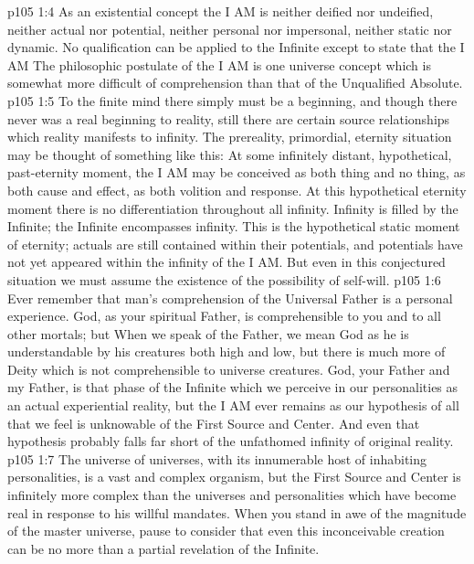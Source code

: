 \vs p105 1:4 As an existential concept the I AM is neither deified nor undeified, neither actual nor potential, neither personal nor impersonal, neither static nor dynamic. No qualification can be applied to the Infinite except to state that the I AM  The philosophic postulate of the I AM is one universe concept which is somewhat more difficult of comprehension than that of the Unqualified Absolute.
\vs p105 1:5 To the finite mind there simply must be a beginning, and though there never was a real beginning to reality, still there are certain source relationships which reality manifests to infinity. The prereality, primordial, eternity situation may be thought of something like this: At some infinitely distant, hypothetical, past\hyp{}eternity moment, the I AM may be conceived as both thing and no thing, as both cause and effect, as both volition and response. At this hypothetical eternity moment there is no differentiation throughout all infinity. Infinity is filled by the Infinite; the Infinite encompasses infinity. This is the hypothetical static moment of eternity; actuals are still contained within their potentials, and potentials have not yet appeared within the infinity of the I AM. But even in this conjectured situation we must assume the existence of the possibility of self\hyp{}will.
\pc \vs p105 1:6 Ever remember that man’s comprehension of the Universal Father is a personal experience. God, as your spiritual Father, is comprehensible to you and to all other mortals; but  When we speak of the Father, we mean God as he is understandable by his creatures both high and low, but there is much more of Deity which is not comprehensible to universe creatures. God, your Father and my Father, is that phase of the Infinite which we perceive in our personalities as an actual experiential reality, but the I AM ever remains as our hypothesis of all that we feel is unknowable of the First Source and Center. And even that hypothesis probably falls far short of the unfathomed infinity of original reality.
\vs p105 1:7 The universe of universes, with its innumerable host of inhabiting personalities, is a vast and complex organism, but the First Source and Center is infinitely more complex than the universes and personalities which have become real in response to his willful mandates. When you stand in awe of the magnitude of the master universe, pause to consider that even this inconceivable creation can be no more than a partial revelation of the Infinite.
